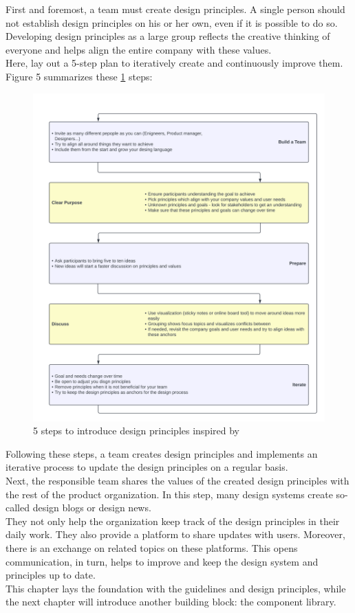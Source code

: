 First and foremost, a team must create design principles. A single person should not establish design principles on his or her own, even if it is possible to do so. Developing design principles as a large group reflects the creative thinking of everyone and helps align the entire company with these values. \\
Here, \citet{vesselov_building_2019} lay out a 5-step plan to iteratively create and continuously improve them. Figure 5 summarizes these  \ref{design_principles_steps} steps:
\newpage


\begin{figure}[htbp]
\centerline{\includegraphics[width=\linewidth]{images/design_principles_steps.png}}
\caption{5 steps to introduce design principles inspired by  \citet{vesselov_building_2019}}
\label{design_principles_steps}
\end{figure}
Following these steps, a team creates design principles and implements an iterative process to update the design principles on a regular basis. \\
Next, the responsible team shares the values of the created design principles with the rest of the product organization. In this step, many design systems create so-called design blogs or design news. \\
They not only help the organization keep track of the design principles in their daily work. They also provide a platform to share updates with users. Moreover, there is an exchange on related topics on these platforms. This opens communication, in turn, helps to improve and keep the design system and principles up to date.  \cite{google_material_2022} \\
This chapter lays the foundation with the guidelines and design principles, while the next chapter will introduce another building block: the component library.
